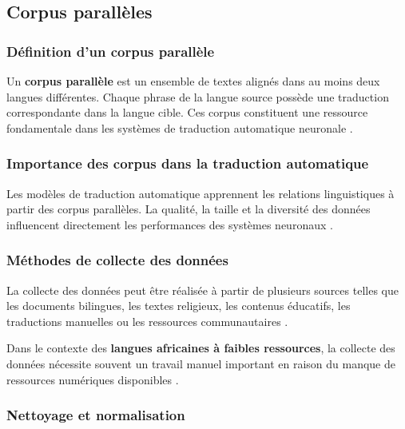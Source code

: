 \subsection{Corpus parallèles}

\subsubsection{Définition d'un corpus parallèle}

Un \textbf{corpus parallèle} est un ensemble de textes alignés dans au moins deux langues différentes. Chaque phrase de la langue source possède une traduction correspondante dans la langue cible. Ces corpus constituent une ressource fondamentale dans les systèmes de traduction automatique neuronale \cite{ranathunga2023neural, haulai2023construction}.

\subsubsection{Importance des corpus dans la traduction automatique}

Les modèles de traduction automatique apprennent les relations linguistiques à partir des corpus parallèles. La qualité, la taille et la diversité des données influencent directement les performances des systèmes neuronaux \cite{ranathunga2023neural, agyei2024low}.

\subsubsection{Méthodes de collecte des données}

La collecte des données peut être réalisée à partir de plusieurs sources telles que les documents bilingues, les textes religieux, les contenus éducatifs, les traductions manuelles ou les ressources communautaires \cite{haulai2023construction, jindal2017building}.

Dans le contexte des \textbf{langues africaines à faibles ressources}, la collecte des données nécessite souvent un travail manuel important en raison du manque de ressources numériques disponibles \cite{agyei2024low, mandiya2026lingala}.

\subsubsection{Nettoyage et normalisation}

